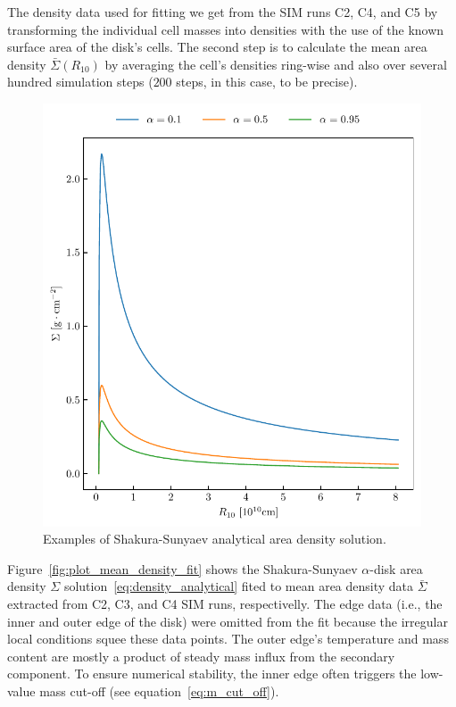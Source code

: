     The density data used for fitting we get from the SIM runs C2, C4, and C5 by transforming the individual cell masses into densities with the use of the known surface area of the disk's cells. The second step is to calculate the mean area density $\bar{\Sigma}(R_{10})$ by averaging the cell's densities ring-wise and also over several hundred simulation steps ($200$ steps, in this case, to be precise). 

    \begin{figure}[H]
    \begin{center}
        \includegraphics[width=1.0\textwidth]{img/plot_density_analytical.pdf}
    \end{center}
    \caption{Examples of Shakura-Sunyaev analytical area density solution.}
    \label{fig:plot_density_analytical}
    \end{figure}

    Figure~\ref{fig:plot_mean_density_fit} shows the Shakura-Sunyaev $\alpha$-disk area density $\Sigma$ solution~\eqref{eq:density_analytical} fited to mean area density data $\bar{\Sigma}$ extracted from C2, C3, and C4 SIM runs, respectivelly. The edge data (i.e., the inner and outer edge of the disk) were omitted from the fit because the irregular local conditions squee these data points. The outer edge's temperature and mass content are mostly a product of steady mass influx from the secondary component. To ensure numerical stability, the inner edge often triggers the low-value mass cut-off (see equation~\eqref{eq:m_cut_off}). 

